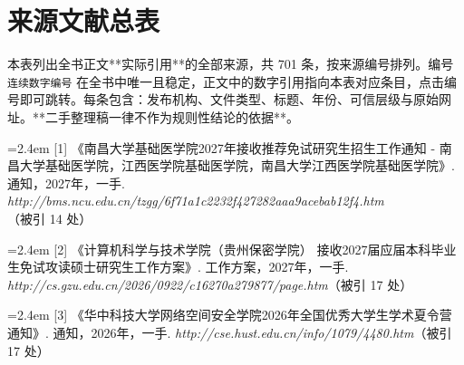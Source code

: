 \chapter{来源文献总表}
\label{back:sources}

\begin{keybox}
本表列出全书正文**实际引用**的全部来源，共 701 条，按来源编号排列。编号 \texttt{连续数字编号} 在全书中唯一且稳定，正文中的数字引用指向本表对应条目，点击编号即可跳转。每条包含：发布机构、文件类型、标题、年份、可信层级与原始网址。**二手整理稿一律不作为规则性结论的依据**。
\end{keybox}

{\scriptsize
\vspace{3.5pt}\par
\nopagebreak\vspace{1pt}
\noindent\hangindent=2.4em \label{src:S0001}{\color{cAccent}[1]} 《南昌大学基础医学院2027年接收推荐免试研究生招生工作通知 - 南昌大学基础医学院，江西医学院基础医学院，南昌大学江西医学院基础医学院》. 通知，2027年，一手. \textit{http://bms.ncu.edu.cn/tzgg/6f71a1c2232f427282aaa9acebab12f4.htm}（被引 14 处）\par
\vspace{0.6pt}
\vspace{3.5pt}\par
\nopagebreak\vspace{1pt}
\noindent\hangindent=2.4em \label{src:S0002}{\color{cAccent}[2]} 《计算机科学与技术学院（贵州保密学院） 接收2027届应届本科毕业生免试攻读硕士研究生工作方案》. 工作方案，2027年，一手. \textit{http://cs.gzu.edu.cn/2026/0922/c16270a279877/page.htm}（被引 17 处）\par
\vspace{0.6pt}
\vspace{3.5pt}\par
\nopagebreak\vspace{1pt}
\noindent\hangindent=2.4em \label{src:S0003}{\color{cAccent}[3]} 《华中科技大学网络空间安全学院2026年全国优秀大学生学术夏令营通知》. 通知，2026年，一手. \textit{http://cse.hust.edu.cn/info/1079/4480.htm}（被引 17 处）\par
\vspace{0.6pt}
\vspace{3.5pt}\par
\nopagebreak\vspace{1pt}
}
